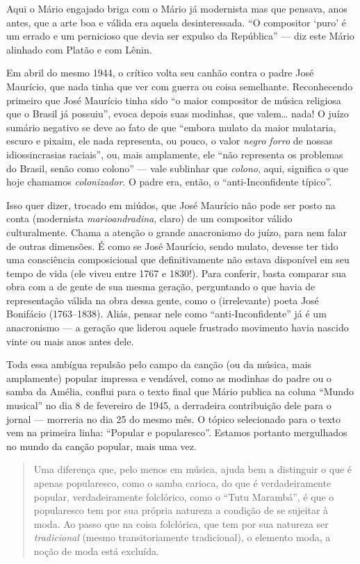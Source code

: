Aqui o Mário engajado briga com o Mário já modernista mas que pensava,
anos antes, que a arte boa e válida era aquela desinteressada. ``O
compositor `puro' é um errado e um pernicioso que devia ser expulso da
República'' --- diz este Mário alinhado com Platão e com Lênin.

Em abril do mesmo 1944, o crítico volta seu canhão contra o padre José
Maurício, que nada tinha que ver com guerra ou coisa semelhante.
Reconhecendo primeiro que José Maurício tinha sido ``o maior compositor
de música religiosa que o Brasil já possuiu'', evoca depois suas
modinhas, que valem\ldots{} nada! O juízo sumário negativo se deve ao fato de
que ``embora mulato da maior mulataria, escuro e pixaim, ele nada
representa, ou pouco, o valor \textit{negro forro} de nossas idiossincrasias
raciais'', ou, mais amplamente, ele ``não representa os problemas do
Brasil, senão como colono'' --- vale sublinhar que \textit{colono}, aqui,
significa o que hoje chamamos \textit{colonizador}. O padre era, então, o
``anti-Inconfidente típico''.

Isso quer dizer, trocado em miúdos, que José Maurício não pode ser posto
na conta (modernista \textit{marioandradina}, claro) de um compositor válido
culturalmente. Chama a atenção o grande anacronismo do juízo, para nem
falar de outras dimensões. É como se José Maurício, sendo mulato,
devesse ter tido uma consciência composicional que definitivamente não
estava disponível em seu tempo de vida (ele viveu entre 1767 e 1830!).
Para conferir, basta comparar sua obra com a de gente de sua mesma
geração, perguntando o que havia de representação válida na obra dessa
gente, como o (irrelevante) poeta José Bonifácio (1763--1838). Aliás,
pensar nele como ``anti-Inconfidente'' já é um anacronismo --- a geração
que liderou aquele frustrado movimento havia nascido vinte ou mais anos
antes dele.

Toda essa ambígua repulsão pelo campo da canção (ou da música, mais
amplamente) popular impressa e vendável, como as modinhas do padre ou o
samba da Amélia, conflui para o texto final que Mário publica na coluna
``Mundo musical'' no dia 8 de fevereiro de 1945, a derradeira
contribuição dele para o jornal --- morreria no dia 25 do mesmo mês. O
tópico selecionado para o texto vem na primeira linha: ``Popular e
popularesco''. Estamos portanto mergulhados no mundo da canção popular,
mais uma vez.

\begin{quote}
Uma diferença que, pelo menos em música, ajuda bem a distinguir o que é
apenas popularesco, como o samba carioca, do que é verdadeiramente
popular, verdadeiramente folclórico, como o ``Tutu Marambá'', é que o
popularesco tem por sua própria natureza a condição de se sujeitar à
moda. Ao passo que na coisa folclórica, que tem por sua natureza ser
\textit{tradicional} (mesmo transitoriamente tradicional), o elemento moda, a
noção de moda está excluída.
\end{quote}

